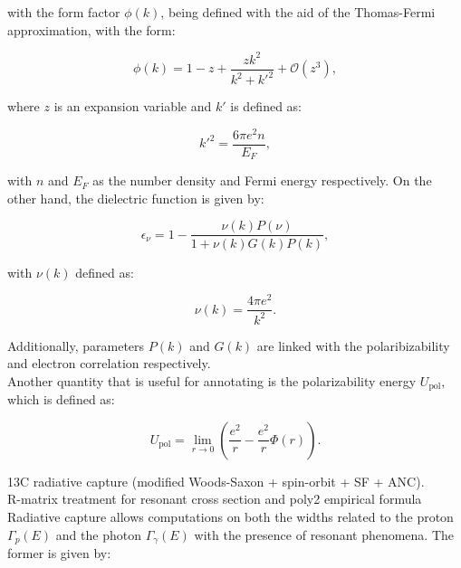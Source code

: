 \documentclass[openany]{book}
\begin{document}
with the form factor $\phi(k)$, being defined with the aid of the Thomas-Fermi approximation, with the form: 

\begin{equation}\label{eq:potential_screening_formFactor}
	\phi(k) = 1 - z + \frac{zk^2}{k^2 + {k'}^2} + \mathcal{O}(z^3),
\end{equation}

where $z$ is an expansion variable and $k'$ is defined as: 

\begin{equation}\label{eq:potential_screening_kThomasFermi}
	{k'}^2 = \frac{6\pi e^2 n}{E_F},
\end{equation}

with $n$ and $E_F$ as the number density and Fermi energy respectively. On the other hand, the dielectric function is given by:

\begin{equation}\label{eq:potential_screening_dielectric}
	\epsilon_\nu = 1 - \frac{\nu(k) P(\nu)}{1 + \nu(k) G(k) P(k)},
\end{equation}

with $\nu(k)$ defined as: 

\begin{equation}\label{eq:potential_screening_nu}
	\nu(k) = \frac{4\pi e^2}{k^2}.
\end{equation}

Additionally, parameters $P(k)$ and $G(k)$ are linked with the polaribizability and electron correlation respectively. \\

Another quantity that is useful for annotating is the polarizability energy $U_{\mathrm{pol}}$, which is defined as: 

\begin{equation}\label{eq:potential_screening_Upolarizability}
	U_{\mathrm{pol}} = \lim_{r \rightarrow 0 } {\left(\frac{e^2}{r} - \frac{e^2}{r} \Phi(r) \right)}.
\end{equation}


13C radiative capture (modified Woods-Saxon + spin-orbit + SF + ANC). \\

R-matrix treatment for resonant cross section and poly2 empirical formula \cite{kabir_irgaziev_nabi_2020} \\

Radiative capture allows computations on both the widths related to the proton $\Gamma_p(E)$ and the photon $\Gamma_\gamma(E)$ with the presence of resonant phenomena. The former is given by: 
\end{document}

